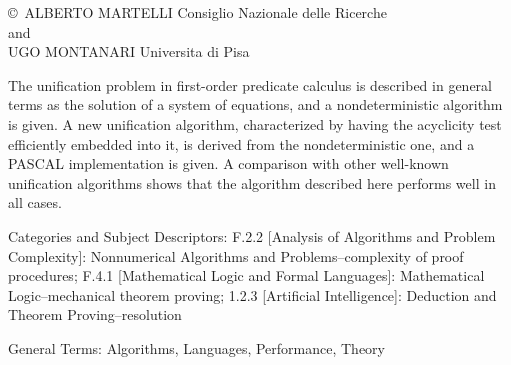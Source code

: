\label{mmalg}\secdown


\noindent\copyright \
ALBERTO MARTELLI
Consiglio Nazionale delle Ricerche
\\and\\
UGO MONTANARI
Universita di Pisa
\bigskip


The unification problem in first-order predicate calculus is described in
general terms as the solution of a system of equations, and a nondeterministic
algorithm is given. A new unification algorithm, characterized by having the
acyclicity test efficiently embedded into it, is derived from the
nondeterministic one, and a PASCAL implementation is given. A comparison with
other well-known unification algorithms shows that the algorithm described here
performs well in all cases.

Categories and Subject Descriptors: F.2.2 [Analysis of Algorithms and Problem
Complexity]: Nonnumerical Algorithms and Problems--complexity of proof
procedures; F.4.1 [Mathematical Logic and Formal Languages]: Mathematical
Logic--mechanical theorem proving; 1.2.3 [Artificial Intelligence]: Deduction
and Theorem Proving--resolution

General Terms: Algorithms, Languages, Performance, Theory 




\secup